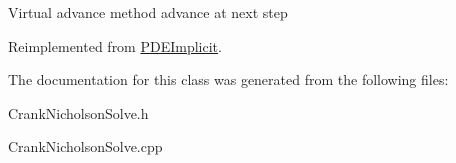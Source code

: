 Virtual advance method advance at next step 

Reimplemented from \hyperlink{class_p_d_e_implicit_a60980fe1e316329ab95ad179fce5a88b}{P\+D\+E\+Implicit}.



The documentation for this class was generated from the following files\+:\begin{DoxyCompactItemize}
\item 
Crank\+Nicholson\+Solve.\+h\item 
Crank\+Nicholson\+Solve.\+cpp\end{DoxyCompactItemize}
